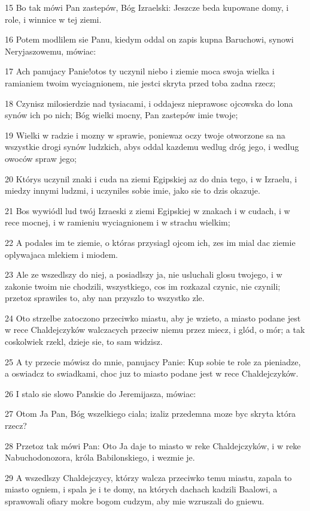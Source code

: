 \par 15 Bo tak mówi Pan zastepów, Bóg Izraelski: Jeszcze beda kupowane domy, i role, i winnice w tej ziemi.
\par 16 Potem modlilem sie Panu, kiedym oddal on zapis kupna Baruchowi, synowi Neryjaszowemu, mówiac:
\par 17 Ach panujacy Panie!otos ty uczynil niebo i ziemie moca swoja wielka i ramianiem twoim wyciagnionem, nie jestci skryta przed toba zadna rzecz;
\par 18 Czynisz milosierdzie nad tysiacami, i oddajesz nieprawosc ojcowska do lona synów ich po nich; Bóg wielki mocny, Pan zastepów imie twoje;
\par 19 Wielki w radzie i mozny w sprawie, poniewaz oczy twoje otworzone sa na wszystkie drogi synów ludzkich, abys oddal kazdemu wedlug dróg jego, i wedlug owoców spraw jego;
\par 20 Którys uczynil znaki i cuda na ziemi Egipskiej az do dnia tego, i w Izraelu, i miedzy innymi ludzmi, i uczyniles sobie imie, jako sie to dzis okazuje.
\par 21 Bos wywiódl lud twój Izraeski z ziemi Egipskiej w znakach i w cudach, i w rece mocnej, i w ramieniu wyciagnionem i w strachu wielkim;
\par 22 A podales im te ziemie, o któras przysiagl ojcom ich, zes im mial dac ziemie oplywajaca mlekiem i miodem.
\par 23 Ale ze wszedlszy do niej, a posiadlszy ja, nie usluchali glosu twojego, i w zakonie twoim nie chodzili, wszystkiego, cos im rozkazal czynic, nie czynili; przetoz sprawiles to, aby nan przyszlo to wszystko zle.
\par 24 Oto strzelbe zatoczono przeciwko miastu, aby je wzieto, a miasto podane jest w rece Chaldejczyków walczacych przeciw niemu przez miecz, i glód, o mór; a tak coskolwiek rzekl, dzieje sie, to sam widzisz.
\par 25 A ty przecie mówisz do mnie, panujacy Panie: Kup sobie te role za pieniadze, a oswiadcz to swiadkami, choc juz to miasto podane jest w rece Chaldejczyków.
\par 26 I stalo sie slowo Panskie do Jeremijasza, mówiac:
\par 27 Otom Ja Pan, Bóg wszelkiego ciala; izaliz przedemna moze byc skryta która rzecz?
\par 28 Przetoz tak mówi Pan: Oto Ja daje to miasto w reke Chaldejczyków, i w reke Nabuchodonozora, króla Babilonskiego, i wezmie je.
\par 29 A wszedlszy Chaldejczycy, którzy walcza przeciwko temu miastu, zapala to miasto ogniem, i spala je i te domy, na których dachach kadzili Baalowi, a sprawowali ofiary mokre bogom cudzym, aby mie wzruszali do gniewu.
